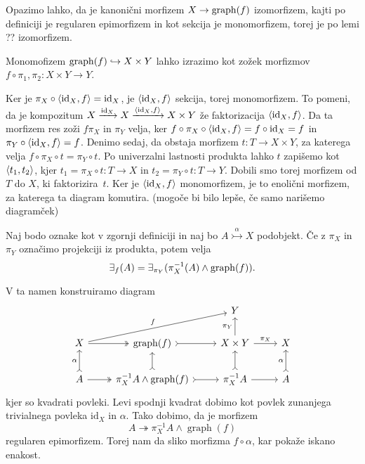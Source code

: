 \documentclass[../kategoricna_logika.tex]{subfiles}
\begin{document}
Opazimo lahko, da je kanonični morfizem $X \to \operatorname{graph}(f)$ izomorfizem,
kajti po definiciji je regularen epimorfizem
in kot sekcija je monomorfizem, torej je po lemi ?? izomorfizem.
\begin{lema}\label{lema:graf-kot-zozek}
  Monomofizem $\operatorname{graph}(f) \hookrightarrow X \times Y$ lahko izrazimo kot zožek morfizmov
  $f\circ \pi_1, \pi_2 : X \times Y \to Y$.
\end{lema}
\begin{dokaz}
  Ker je $\pi_X \circ \langle \mathrm{id}_X, f \rangle = \mathrm{id}_X$, je $\langle \mathrm{id}_X, f \rangle$ sekcija,
  torej monomorfizem. To pomeni, da je kompozitum $X \xrightarrow{\mathrm{id}_X} X \xrightarrow{\langle \mathrm{id}_X, f \rangle} X \times Y$
  že faktorizacija $\langle \mathrm{id}_X, f \rangle$. Da ta morfizem res zoži $f \pi_X$ in $\pi_Y$ velja, ker
  $f \circ \pi_X \circ \langle \mathrm{id}_X, f \rangle = f \circ \mathrm{id}_X = f$ in
  $\pi_Y \circ \langle \mathrm{id}_X, f \rangle = f$. Denimo sedaj, da obstaja morfizem $t : T \to X \times Y$,
  za katerega velja $f \circ \pi_X \circ t = \pi_Y \circ t$. Po univerzalni lastnosti produkta lahko $t$
  zapišemo kot $\langle t_1, t_2 \rangle$, kjer $t_1 = \pi_X \circ t : T \to X$ in $t_2 = \pi_Y \circ t : T \to Y$.
  Dobili smo torej morfizem od $T$ do $X$, ki faktorizira~$t$. Ker je $\langle \mathrm{id}_X, f \rangle$ monomorfizem,
  je to enolični morfizem, za katerega ta diagram komutira. (mogoče bi bilo lepše, če samo narišemo diagramček)
\end{dokaz}
\begin{lema}
  Naj bodo oznake kot v zgornji definiciji in naj bo $A \overset{\alpha}{\rightarrowtail} X$ podobjekt. Če z $\pi_X$ in $\pi_Y$ označimo projekciji iz produkta, potem velja
  $$\exists_f(A) = \exists_{\pi_Y}(\pi_X^{-1}(A) \wedge \operatorname{graph}(f)).$$
\end{lema}
\begin{dokaz}
  V ta namen konstruiramo diagram
  \begin{equation*}
  \begin{tikzcd}
    & & Y & \\
    X \ar[urr, "f"] \ar[r, two heads] & \operatorname{graph}(f) \ar[r, tail] & X \times Y \ar[u, "\pi_Y"] \ar[r, "\pi_X"] & X \\
    A \ar[u, tail, "\alpha"] \ar[r, two heads] & \pi_X^{-1}A \land \operatorname{graph}(f) \ar[u, tail] \ar[r, tail] & \pi_X^{-1}A \ar[u, tail] \ar[r] & A \ar[u, tail, "\alpha"]
  \end{tikzcd}
  \end{equation*}
  kjer so kvadrati povleki.
  Levi spodnji kvadrat dobimo kot povlek zunanjega trivialnega povleka $\mathrm{id}_X$ in $\alpha$.
  Tako dobimo, da je morfizem 
  $$A \twoheadrightarrow \pi_X^{-1}A \land \operatorname{graph}(f)$$
  regularen epimorfizem.
  Torej nam da sliko morfizma $f \circ \alpha$, kar pokaže iskano enakost.
\end{dokaz}
\end{document}
